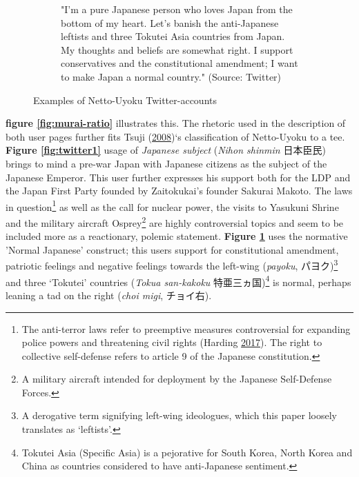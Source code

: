 \documentclass[10pt,british,A4paper,,openany]{memoir}
\begin{document}
\begin{figure}[!htb]
\begin{subfigure}[b]{0.40\textwidth}
  \caption{"I'm a pure Japanese person who loves Japan from the bottom of my heart. Let's banish the anti-Japanese leftists and three Tokutei Asia countries from Japan. My thoughts and beliefs are somewhat right. I support conservatives and the constitutional amendment; I want to make Japan a normal country." (Source: Twitter)}
  \label{fig:twitter2}
 \end{subfigure}
 \caption{Examples of Netto-Uyoku Twitter-accounts}\label{fig:twitter}
\end{figure}

\textbf{figure \ref{fig:murai-ratio}} illustrates this. The rhetoric
used in the description of both user pages further fits Tsuji
(\protect\hyperlink{ref-tsuji_eng:_2008}{2008})`s classification of
Netto-Uyoku to a tee. \textbf{Figure \ref{fig:twitter1}} usage of
\emph{Japanese subject} (\emph{Nihon shinmin} 日本臣民) brings to mind a
pre-war Japan with Japanese citizens as the subject of the Japanese
Emperor. This user further expresses his support both for the LDP and
the Japan First Party founded by Zaitokukai's founder Sakurai Makoto.
The laws in question\footnote{The anti-terror laws refer to preemptive
  measures controversial for expanding police powers and threatening
  civil rights (Harding
  \protect\hyperlink{ref-harding_japan_2017}{2017}). The right to
  collective self-defense refers to article 9 of the Japanese
  constitution.} as well as the call for nuclear power, the visits to
Yasukuni Shrine and the military aircraft Osprey\footnote{A military
  aircraft intended for deployment by the Japanese Self-Defense Forces.}
are highly controversial topics and seem to be included more as a
reactionary, polemic statement. \textbf{Figure \ref{fig:twitter2}} uses
the normative 'Normal Japanese' construct; this users support for
constitutional amendment, patriotic feelings and negative feelings
towards the left-wing (\emph{payoku}, パヨク)\footnote{A derogative term
  signifying left-wing ideologues, which this paper loosely translates
  as `leftists'.} and three `Tokutei' countries (\emph{Tokua san-kakoku}
特亜三ヵ国)\footnote{Tokutei Asia (Specific Asia) is a pejorative for
  South Korea, North Korea and China as countries considered to have
  anti-Japanese sentiment.} is normal, perhaps leaning a tad on the
right (\emph{choi migi}, チョイ右).
\end{document}
